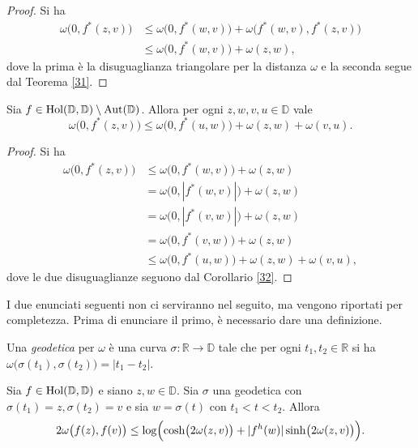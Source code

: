 \begin{proof}
  Si ha
  \begin{align*}
    \omega\bigl(0,f^*(z,v)\bigr) & \le \omega\bigl(0,f^*(w,v)\bigr)+\omega\bigl(f^*(w,v),f^*(z,v)\bigr) \\
    & \le \omega\bigl(0,f^*(w,v)\bigr)+\omega(z,w),
  \end{align*}
  dove la prima è la disuguaglianza triangolare per la distanza $\omega$ e la seconda segue dal Teorema \ref{31}.
\end{proof}

\begin{cor} \label{33}
  Sia $f \in \text{\normalfont{Hol}}(\mathbb{D},\mathbb{D})\setminus\text{\normalfont{Aut}}(\mathbb{D})$. Allora per ogni $z, w, v, u \in \mathbb{D}$ vale
  \begin{equation}
    \omega\bigl(0, f^*(z,v)\bigr) \le \omega\bigl(0, f^*(u,w)\bigr)+\omega(z,w)+\omega(v,u).
  \end{equation}
\end{cor}

\begin{proof}
  Si ha
  \begin{align*}
    \omega\bigl(0,f^*(z,v)\bigr) & \le \omega\bigl(0,f^*(w,v)\bigr)+\omega(z,w) \\
    & =\omega\bigl(0,|f^*(w,v)|\bigr)+\omega(z,w) \\
    & =\omega\bigl(0,|f^*(v,w)|\bigr)+\omega(z,w) \\
    & =\omega\bigl(0,f^*(v,w)\bigr)+\omega(z,w) \\
    & \le \omega\bigl(0,f^*(u,w)\bigr)+\omega(z,w)+\omega(v,u),
  \end{align*}
  dove le due disuguaglianze seguono dal Corollario \ref{32}.
\end{proof}

I due enunciati seguenti non ci serviranno nel seguito, ma vengono riportati per completezza. Prima di enunciare il primo, è necessario dare una definizione.

\begin{defn}
  Una \textit{geodetica} per $\omega$ è una curva $\sigma: \mathbb{R} \longrightarrow \mathbb{D}$ tale che per ogni $t_1,t_2 \in \mathbb{R}$ si ha $\omega\bigl(\sigma(t_1),\sigma(t_2)\bigr)=|t_1-t_2|$.
\end{defn}

\begin{cor} \label{35}
  Sia $f \in \normalfont{\text{Hol}}(\mathbb{D},\mathbb{D})$ e siano $z, w \in \mathbb{D}$. Sia $\sigma$ una geodetica con $\sigma(t_1)=z, \sigma(t_2)=v$ e sia $w=\sigma(t)$ con $t_1<t<t_2$. Allora
  \begin{equation} \label{geod}
    2\omega\bigl(f(z),f(v)\bigr) \le \log\Bigl(\cosh\bigl(2\omega(z,v)\bigr)+|f^h(w)|\sinh\bigl(2\omega(z,v)\bigr)\Bigr).
  \end{equation}
\end{cor}

